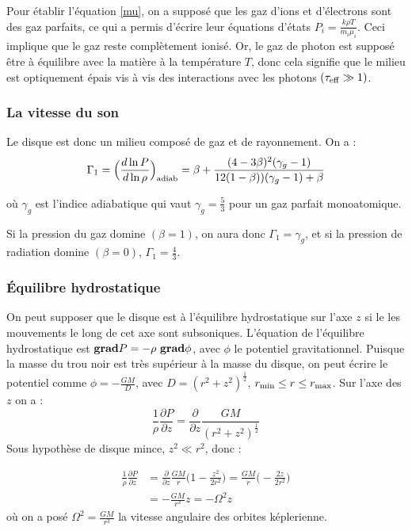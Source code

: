 \documentclass[a4paper,12pt]{article}
\begin{document}
Pour établir l'équation \eqref{mu}, on a supposé que les gaz d'ions et d'électrons sont des gaz parfaits, ce qui a permis d'écrire leur équations d'états $P_i=\frac{k\rho T}{m_i\mu_i}$. Ceci implique que le gaz reste complètement ionisé. Or, le gaz de photon est supposé être à équilibre avec la matière à la température $T$, donc cela signifie que le milieu est optiquement épais vis à vis des interactions avec les photons $(\tau_{\rm{eff}} \gg 1)$.

\subsubsection{La vitesse du son}

Le disque est donc un milieu composé de gaz et de rayonnement. On a :
\begin{equation*}
    \Gamma_1=\Big(\frac{d \ln P}{d \ln \rho}\Big)_{\rm{adiab}}=\beta + \frac{(4-3\beta)^2(\gamma_g - 1)}{12(1-\beta) )(\gamma_g -1)+\beta}
\end{equation*}

où $\gamma_g$ est l'indice adiabatique qui vaut $\gamma_g=\frac{5}{3}$ pour un gaz parfait monoatomique.

Si la pression du gaz domine $(\beta=1)$, on aura donc $\Gamma_1=\gamma_g$, et si la pression de radiation domine $(\beta=0)$, $\Gamma_1=\frac{4}{3}$.

\subsubsection{Équilibre hydrostatique}

On peut supposer que le disque est à l'équilibre hydrostatique sur l'axe $z$ si le les mouvements le long de cet axe sont subsoniques. L'équation de l'équilibre hydrostatique est $\text{\bf{grad}} P=-\rho \text{ \bf{grad}}\phi$, avec $\phi$ le potentiel gravitationnel. Puisque la masse du trou noir est très supérieur à la masse du disque, on peut écrire le potentiel comme $\phi=-\frac{GM}{D}$, avec $D=(r^2+z^2)^{\frac{1}{2}}$, $r_{\rm{min}}\le r\le r_{\rm{max}}$.
Sur l'axe des $z$ on a :
\begin{equation*}
    \frac{1}{\rho}\frac{\partial P}{\partial z}=\frac{\partial}{\partial z} \frac{GM}{(r^2+z^2)^{\frac{1}{2}}}
\end{equation*}
Sous hypothèse de disque mince, $z^2\ll r^2$, donc :

\begin{equation*}
\begin{split}
    \frac{1}{\rho}\frac{\partial P}{\partial z} &=\frac{\partial}{\partial z} \frac{GM}{r}\Big(1- \frac{z^2}{2r^2}\Big)=\frac{GM}{r}\Big( -\frac{2z}{2r^2}\Big)\\
    &=-\frac{GM}{r^3}z=-\Omega ^2z
\end{split}
\end{equation*}
où on a posé $\Omega^2 = \frac{GM}{r^3}$ la vitesse angulaire des orbites képlerienne.
\end{document}
